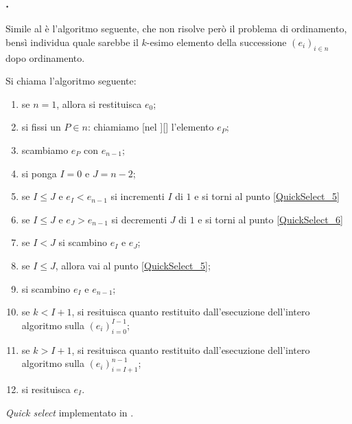 \subsubsection{.}
\label{AlgoritmiEStruttureDiDati_QuickSelect}
\par Simile al  \`e l'algoritmo seguente, che non risolve
per\`o il problema di ordinamento, bens\`i individua quale sarebbe il $k$-esimo
elemento della successione $(e_i)_{i \in n}$ dopo ordinamento.
\begin{Definition}
	Si chiama
  l'algoritmo seguente:
  \begin{enumerate}
    \item\label{QuickSelect_1} se $n = 1$, allora si restituisca $e_0$;
    \item\label{QuickSelect_2} si fissi un $P \in n$: chiamiamo
      [nel ][]
      l'elemento $e_P$;
    \item\label{QuickSelect_3} scambiamo $e_P$ con $e_{n - 1}$;
    \item\label{QuickSelect_4} si ponga $I = 0$ e $J = n - 2$;
    \item\label{QuickSelect_5} se
      $I \leq J$ e $e_I < e_{n - 1}$
      si incrementi $I$ di $1$ e si torni al punto
      \ref{QuickSelect_5}
    \item\label{QuickSelect_6} se
      $I \leq J$ e $e_J > e_{n - 1}$
      si decrementi $J$ di $1$ e si torni al punto
      \ref{QuickSelect_6}
    \item\label{QuickSelect_7} se $I < J$ si scambino
      $e_I$ e $e_J$;
    \item\label{QuickSelect_8} se $I \leq J$, allora vai al punto
      \ref{QuickSelect_5};
    \item\label{QuickSelect_9} si scambino
      $e_I$ e $e_{n - 1}$;
    \item\label{QuickSelect_10} se $k < I + 1$, si resituisca quanto restituito
      dall'esecuzione dell'intero algoritmo sulla $(e_i)_{i = 0}^{I - 1}$;
    \item\label{QuickSelect_11} se $k > I + 1$, si resituisca quanto restituito
      dall'esecuzione dell'intero algoritmo sulla $(e_i)_{i = I + 1}^{n - 1}$;
    \item\label{QuickSelect_12} si resituisca $e_I$.
  \end{enumerate}
\end{Definition}
\begin{listing}
	\caption{\textit{Quick select} implementato in .}
\end{listing}
